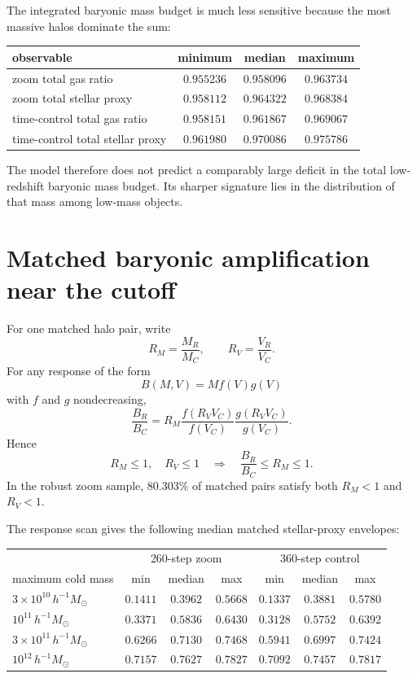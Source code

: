 The integrated baryonic mass budget is much less sensitive because the most massive halos dominate the sum:
\begin{center}
\begin{tabular}{lccc}
\toprule
observable & minimum & median & maximum\\
\midrule
zoom total gas ratio & $0.955236$ & $0.958096$ & $0.963734$\\
zoom total stellar proxy & $0.958112$ & $0.964322$ & $0.968384$\\
time-control total gas ratio & $0.958151$ & $0.961867$ & $0.969067$\\
time-control total stellar proxy & $0.961980$ & $0.970086$ & $0.975786$\\
\bottomrule
\end{tabular}
\end{center}
The model therefore does not predict a comparably large deficit in the total low-redshift baryonic mass budget.  Its sharper signature lies in the distribution of that mass among low-mass objects.

\section{Matched baryonic amplification near the cutoff}

For one matched halo pair, write
\[
R_M=\frac{M_R}{M_C},
\qquad
R_V=\frac{V_R}{V_C}.
\]
For any response of the form
\[
B(M,V)=M f(V)g(V)
\]
with $f$ and $g$ nondecreasing,
\begin{equation}
\frac{B_R}{B_C}
=
R_M\frac{f(R_VV_C)}{f(V_C)}\frac{g(R_VV_C)}{g(V_C)}.
\label{eq:brf-matched-response-ratio}
\end{equation}
Hence
\begin{equation}
R_M\le1,
\quad R_V\le1
\quad\Longrightarrow\quad
\frac{B_R}{B_C}\le R_M\le1.
\label{eq:brf-baryonic-amplification-theorem}
\end{equation}
In the robust zoom sample, $80.303\%$ of matched pairs satisfy both $R_M<1$ and $R_V<1$.

The response scan gives the following median matched stellar-proxy envelopes:
\begin{center}
\small
\begin{tabular}{lccc|ccc}
\toprule
&\multicolumn{3}{c}{260-step zoom}&\multicolumn{3}{c}{360-step control}\\
maximum cold mass & min & median & max & min & median & max\\
\midrule
$3\times10^{10}\,h^{-1}M_\odot$ & $0.1411$ & $0.3962$ & $0.5668$ & $0.1337$ & $0.3881$ & $0.5780$\\
$10^{11}\,h^{-1}M_\odot$ & $0.3371$ & $0.5836$ & $0.6430$ & $0.3128$ & $0.5752$ & $0.6392$\\
$3\times10^{11}\,h^{-1}M_\odot$ & $0.6266$ & $0.7130$ & $0.7468$ & $0.5941$ & $0.6997$ & $0.7424$\\
$10^{12}\,h^{-1}M_\odot$ & $0.7157$ & $0.7627$ & $0.7827$ & $0.7092$ & $0.7457$ & $0.7817$\\
\bottomrule
\end{tabular}
\end{center}

